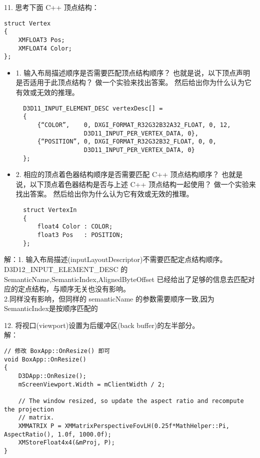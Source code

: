 \begin{flushleft}
11. 思考下面 C++ 顶点结构：
\end{flushleft}
\begin{lstlisting}
struct Vertex
{
    XMFLOAT3 Pos;
    XMFLOAT4 Color;
};
\end{lstlisting}
\begin{itemize}
  \item 1. 输入布局描述顺序是否需要匹配顶点结构顺序？ 也就是说，以下顶点声明是否适用于此顶点结构？ 做一个实验来找出答案。 然后给出你为什么认为它有效或无效的推理。
  \begin{lstlisting}
  D3D11_INPUT_ELEMENT_DESC vertexDesc[] =
  {
      {“COLOR”,    0, DXGI_FORMAT_R32G32B32A32_FLOAT, 0, 12,
                   D3D11_INPUT_PER_VERTEX_DATA, 0},
      {“POSITION”, 0, DXGI_FORMAT_R32G32B32_FLOAT, 0, 0,
                   D3D11_INPUT_PER_VERTEX_DATA, 0}
  };
  \end{lstlisting}
  \item 2. 相应的顶点着色器结构顺序是否需要匹配 C++ 顶点结构顺序？ 也就是说，以下顶点着色器结构是否与上述 C++ 顶点结构一起使用？ 做一个实验来找出答案。 然后给出你为什么认为它有效或无效的推理。
  \begin{lstlisting}
  struct VertexIn
  {
      float4 Color : COLOR;
      float3 Pos   : POSITION;
  };
  \end{lstlisting}
\end{itemize}
\begin{flushleft}
解：1. 输入布局描述(inputLayoutDescriptor)不需要匹配定点结构顺序。D3D12\_INPUT\_ELEMENT\_DESC 的 SemanticName,SemanticIndex,AlignedByteOffset 已经给出了足够的信息去匹配对应的定点结构，与顺序无关也没有影响。\\
2.同样没有影响，但同样的 semanticName 的参数需要顺序一致,因为SemanticIndex是按顺序匹配的
\end{flushleft}

\begin{flushleft}
12. 将视口(viewport)设置为后缓冲区(back buffer)的左半部分。\\
解：
\end{flushleft}
\begin{lstlisting}
// 修改 BoxApp::OnResize() 即可
void BoxApp::OnResize()
{
    D3DApp::OnResize();
    mScreenViewport.Width = mClientWidth / 2;

    // The window resized, so update the aspect ratio and recompute the projection
    // matrix.
    XMMATRIX P = XMMatrixPerspectiveFovLH(0.25f*MathHelper::Pi, AspectRatio(), 1.0f, 1000.0f);
    XMStoreFloat4x4(&mProj, P);
}
\end{lstlisting}

